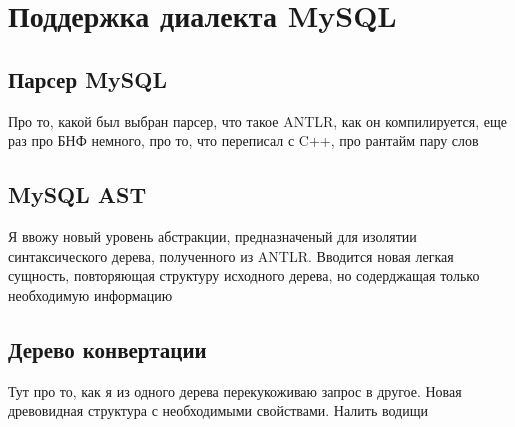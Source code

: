 \section{Поддержка диалекта MySQL}
\subsection{Парсер MySQL}
Про то, какой был выбран парсер, что такое ANTLR, как он компилируется, еще раз про БНФ немного, про то, что переписал с C++, про рантайм пару слов
\subsection{MySQL AST}
Я ввожу новый уровень абстракции, предназначеный для изолятии синтаксического дерева, полученного из ANTLR. Вводится новая легкая сущность, повторяющая структуру исходного дерева, но содерджащая только необходимую информацию
\subsection{Дерево конвертации}
Тут про то, как я из одного дерева перекукоживаю запрос в другое. Новая древовидная структура с необходимыми свойствами. Налить водищи
